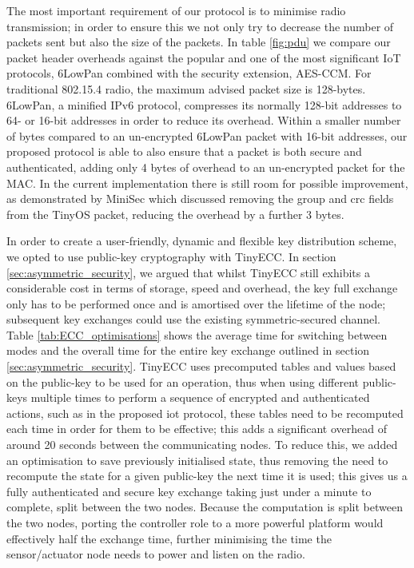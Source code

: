 \documentclass[conference]{./sty/IEEEtran}
\begin{document}
The most important requirement of our protocol is to minimise radio transmission; in order to ensure this we not only try to decrease the number of packets sent but also the size of the packets. In table \ref{fig:pdu} we compare our packet header overheads against the popular and one of the most significant IoT protocols, 6LowPan combined with the security extension, AES-CCM. For traditional 802.15.4 radio, the maximum advised packet size is 128-bytes. 6LowPan, a minified IPv6 protocol, compresses its normally 128-bit addresses to 64- or 16-bit addresses in order to reduce its overhead. Within a smaller number of bytes compared to an un-encrypted 6LowPan packet with 16-bit addresses, our proposed protocol is able to also ensure that a packet is both secure and authenticated, adding only 4 bytes of overhead to an un-encrypted packet for the MAC. In the current implementation there is still room for possible improvement, as demonstrated by MiniSec which discussed removing the group and crc fields from the TinyOS packet, reducing the overhead by a further 3 bytes.

In order to create a user-friendly, dynamic and flexible key distribution scheme, we opted to use public-key cryptography with TinyECC. In section \ref{sec:asymmetric_security}, we argued that whilst TinyECC still exhibits a considerable cost in terms of storage, speed and overhead, the key full exchange only has to be performed once and is amortised over the lifetime of the node; subsequent key exchanges could use the existing symmetric-secured channel. Table \ref{tab:ECC_optimisations} shows the average time for switching between modes and the overall time for the entire key exchange outlined in section \ref{sec:asymmetric_security}. TinyECC uses precomputed tables and values based on the public-key to be used for an operation, thus when using different public-keys multiple times to perform a sequence of encrypted and authenticated actions, such as in the proposed iot protocol, these tables need to be recomputed each time in order for them to be effective; this adds a significant overhead of around 20 seconds between the communicating nodes. To reduce this, we added an optimisation to save previously initialised state, thus removing the need to recompute the state for a given public-key the next time it is used; this gives us a fully authenticated and secure key exchange taking just under a minute to complete, split between the two nodes. Because the computation is split between the two nodes, porting the controller role to a more powerful platform would effectively half the exchange time, further minimising the time the sensor/actuator node needs to power and listen on the radio. 
\end{document}

